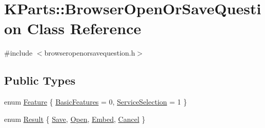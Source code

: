 \hypertarget{classKParts_1_1BrowserOpenOrSaveQuestion}{\section{K\+Parts\+:\+:Browser\+Open\+Or\+Save\+Question Class Reference}
\label{classKParts_1_1BrowserOpenOrSaveQuestion}
}


{\ttfamily \#include $<$browseropenorsavequestion.\+h$>$}

\subsection*{Public Types}
\begin{DoxyCompactItemize}
\item 
enum \hyperlink{classKParts_1_1BrowserOpenOrSaveQuestion_a9dfe6a7919cfadff826a357e94ac3a9a}{Feature} \{ \hyperlink{classKParts_1_1BrowserOpenOrSaveQuestion_a9dfe6a7919cfadff826a357e94ac3a9aa1cfa50dab189d46bdc4a66c5a1763168}{Basic\+Features} = 0, 
\hyperlink{classKParts_1_1BrowserOpenOrSaveQuestion_a9dfe6a7919cfadff826a357e94ac3a9aa3bc1c3177b1a3c8f4cd297ae558c155e}{Service\+Selection} = 1
 \}
\item 
enum \hyperlink{classKParts_1_1BrowserOpenOrSaveQuestion_a12842198b7684e9e246e9a207eabc93f}{Result} \{ \hyperlink{classKParts_1_1BrowserOpenOrSaveQuestion_a12842198b7684e9e246e9a207eabc93fad5f24b54978bf4ec2a36720d33ad7609}{Save}, 
\hyperlink{classKParts_1_1BrowserOpenOrSaveQuestion_a12842198b7684e9e246e9a207eabc93fa1135dc1f27b120bdd6dc83dd7254b60b}{Open}, 
\hyperlink{classKParts_1_1BrowserOpenOrSaveQuestion_a12842198b7684e9e246e9a207eabc93fa9038d40b03609466a8433c35b428bf5a}{Embed}, 
\hyperlink{classKParts_1_1BrowserOpenOrSaveQuestion_a12842198b7684e9e246e9a207eabc93fac5e1d49f3047805e8f216f11cbe903ab}{Cancel}
 \}
\end{DoxyCompactItemize}
